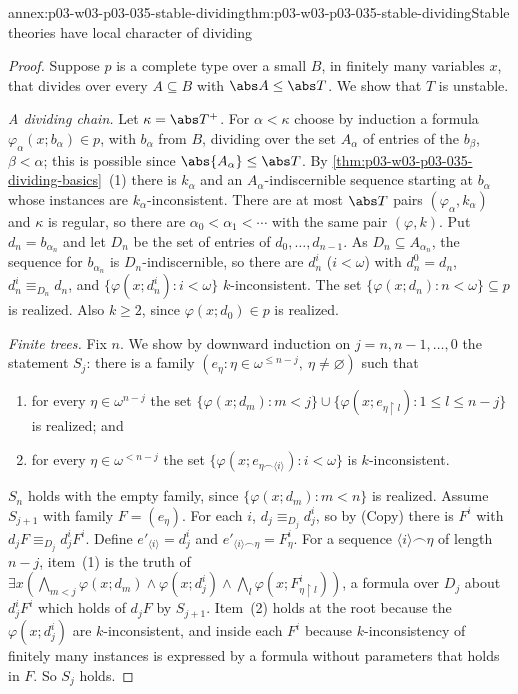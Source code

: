 \begin{annexitem}{annex:p03-w03-p03-035-stable-dividing}{thm:p03-w03-p03-035-stable-dividing}{Stable theories have local character of dividing}
\begin{proof}
Suppose \(p\) is a complete type over a small \(B\), in finitely many
variables \(x\), that divides over every \(A\subseteq B\) with
\(\abs A\leq\abs T\).  We show that \(T\) is unstable.

\emph{A dividing chain.}  Let \(\kappa=\abs T^+\).  For \(\alpha<\kappa\)
choose by induction a formula \(\varphi_\alpha(x;b_\alpha)\in p\), with
\(b_\alpha\) from \(B\), dividing over the set \(A_\alpha\) of entries of the
\(b_\beta\), \(\beta<\alpha\); this is possible since
\(\abs{A_\alpha}\leq\abs T\).  By
\cref{thm:p03-w03-p03-035-dividing-basics}~(1) there is \(k_\alpha\) and an
\(A_\alpha\)-indiscernible sequence starting at \(b_\alpha\) whose instances
are \(k_\alpha\)-inconsistent.  There are at most \(\abs T\) pairs
\((\varphi_\alpha,k_\alpha)\) and \(\kappa\) is regular, so there are
\(\alpha_0<\alpha_1<\cdots\) with the same pair \((\varphi,k)\).  Put
\(d_n=b_{\alpha_n}\) and let \(D_n\) be the set of entries of
\(d_0,\ldots,d_{n-1}\).  As \(D_n\subseteq A_{\alpha_n}\), the sequence for
\(b_{\alpha_n}\) is \(D_n\)-indiscernible, so there are \(d_n^i\)
(\(i<\omega\)) with \(d_n^0=d_n\), \(d_n^i\equiv_{D_n}d_n\), and
\(\{\varphi(x;d_n^i):i<\omega\}\) \(k\)-inconsistent.  The set
\(\{\varphi(x;d_n):n<\omega\}\subseteq p\) is realized.  Also \(k\geq2\), since
\(\varphi(x;d_0)\in p\) is realized.

\emph{Finite trees.}  Fix \(n\).  We show by downward induction on
\(j=n,n-1,\ldots,0\) the statement \(S_j\): there is a family
\((e_\eta:\eta\in\omega^{\leq n-j},\ \eta\neq\varnothing)\) such that
\begin{enumerate}
  \item for every \(\eta\in\omega^{n-j}\) the set
        \(\{\varphi(x;d_m):m<j\}\cup\{\varphi(x;e_{\eta\restriction l}):
        1\leq l\leq n-j\}\) is realized; and
  \item for every \(\eta\in\omega^{<n-j}\) the set
        \(\{\varphi(x;e_{\eta\frown\langle i\rangle}):i<\omega\}\) is
        \(k\)-inconsistent.
\end{enumerate}
\(S_n\) holds with the empty family, since \(\{\varphi(x;d_m):m<n\}\) is
realized.  Assume \(S_{j+1}\) with family \(F=(e_\eta)\).  For each \(i\),
\(d_j\equiv_{D_j}d^i_j\), so by (Copy) there is \(F^i\) with
\(d_jF\equiv_{D_j}d^i_jF^i\).  Define \(e'_{\langle i\rangle}=d^i_j\) and
\(e'_{\langle i\rangle\frown\eta}=F^i_\eta\).  For a sequence
\(\langle i\rangle\frown\eta\) of length \(n-j\), item~(1) is the truth of
\(\exists x(\bigwedge_{m<j}\varphi(x;d_m)\wedge\varphi(x;d^i_j)\wedge
\bigwedge_l\varphi(x;F^i_{\eta\restriction l}))\), a formula over \(D_j\) about
\(d^i_jF^i\) which holds of \(d_jF\) by \(S_{j+1}\).  Item~(2) holds at the
root because the \(\varphi(x;d^i_j)\) are \(k\)-inconsistent, and inside each
\(F^i\) because \(k\)-inconsistency of finitely many instances is expressed by
a formula without parameters that holds in \(F\).  So \(S_j\) holds.


\end{proof}
\end{annexitem}
